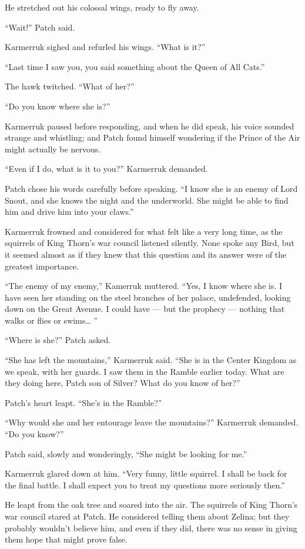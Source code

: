\documentclass[ebook,oneside,openany,12pt]{memoir}
\begin{document}
He stretched out his colossal wings, ready to fly away.

“Wait!” Patch said.

Karmerruk sighed and refurled his wings. “What is it?”

“Last time I saw you, you said something about the Queen of All Cats.”

The hawk twitched. “What of her?”

“Do you know where she is?”

Karmerruk paused before responding, and when he did speak, his voice
sounded strange and whistling; and Patch found himself wondering if
the Prince of the Air might actually be nervous.

“Even if I do, what is it to you?” Karmerruk demanded.

Patch chose his words carefully before speaking. “I know she is an
enemy of Lord Snout, and she knows the night and the underworld. She
might be able to find him and drive him into your claws.”

Karmerruk frowned and considered for what felt like a very long time,
as the squirrels of King Thorn’s war council listened silently. None
spoke any Bird, but it seemed almost as if they knew that this
question and its answer were of the greatest importance.

“The enemy of my enemy,” Kamerruk muttered. “Yes, I know where she
is. I have seen her standing on the steel branches of her palace,
undefended, looking down on the Great Avenue. I could have — but the
prophecy — nothing that walks or flies or swims… ”

“Where is she?” Patch asked.

“She has left the mountains,” Karmerruk said. “She is in the Center
Kingdom as we speak, with her guards. I saw them in the Ramble earlier
today. What are they doing here, Patch son of Silver? What do you know
of her?”

Patch’s heart leapt. “She’s in the Ramble?”

“Why would she and her entourage leave the mountains?” Karmerruk
demanded. “Do you know?”

Patch said, slowly and wonderingly, “She might be looking for me.”

Karmerruk glared down at him. “Very funny, little squirrel. I shall be
back for the final battle. I shall expect you to treat my questions
more seriously then.”

He leapt from the oak tree and soared into the air. The squirrels of
King Thorn’s war council stared at Patch. He considered telling them
about Zelina; but they probably wouldn’t believe him, and even if they
did, there was no sense in giving them hope that might prove false.
\end{document}
